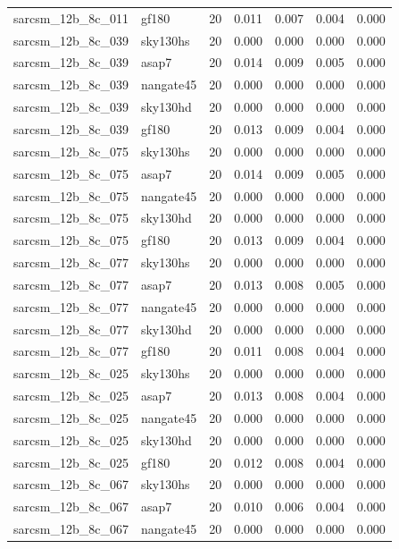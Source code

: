 \begin{tabular}{llrrrrr}
sarcsm\_12b\_8c\_011 & gf180 & 20 & 0.011 & 0.007 & 0.004 & 0.000 \\
sarcsm\_12b\_8c\_039 & sky130hs & 20 & 0.000 & 0.000 & 0.000 & 0.000 \\
sarcsm\_12b\_8c\_039 & asap7 & 20 & 0.014 & 0.009 & 0.005 & 0.000 \\
sarcsm\_12b\_8c\_039 & nangate45 & 20 & 0.000 & 0.000 & 0.000 & 0.000 \\
sarcsm\_12b\_8c\_039 & sky130hd & 20 & 0.000 & 0.000 & 0.000 & 0.000 \\
sarcsm\_12b\_8c\_039 & gf180 & 20 & 0.013 & 0.009 & 0.004 & 0.000 \\
sarcsm\_12b\_8c\_075 & sky130hs & 20 & 0.000 & 0.000 & 0.000 & 0.000 \\
sarcsm\_12b\_8c\_075 & asap7 & 20 & 0.014 & 0.009 & 0.005 & 0.000 \\
sarcsm\_12b\_8c\_075 & nangate45 & 20 & 0.000 & 0.000 & 0.000 & 0.000 \\
sarcsm\_12b\_8c\_075 & sky130hd & 20 & 0.000 & 0.000 & 0.000 & 0.000 \\
sarcsm\_12b\_8c\_075 & gf180 & 20 & 0.013 & 0.009 & 0.004 & 0.000 \\
sarcsm\_12b\_8c\_077 & sky130hs & 20 & 0.000 & 0.000 & 0.000 & 0.000 \\
sarcsm\_12b\_8c\_077 & asap7 & 20 & 0.013 & 0.008 & 0.005 & 0.000 \\
sarcsm\_12b\_8c\_077 & nangate45 & 20 & 0.000 & 0.000 & 0.000 & 0.000 \\
sarcsm\_12b\_8c\_077 & sky130hd & 20 & 0.000 & 0.000 & 0.000 & 0.000 \\
sarcsm\_12b\_8c\_077 & gf180 & 20 & 0.011 & 0.008 & 0.004 & 0.000 \\
sarcsm\_12b\_8c\_025 & sky130hs & 20 & 0.000 & 0.000 & 0.000 & 0.000 \\
sarcsm\_12b\_8c\_025 & asap7 & 20 & 0.013 & 0.008 & 0.004 & 0.000 \\
sarcsm\_12b\_8c\_025 & nangate45 & 20 & 0.000 & 0.000 & 0.000 & 0.000 \\
sarcsm\_12b\_8c\_025 & sky130hd & 20 & 0.000 & 0.000 & 0.000 & 0.000 \\
sarcsm\_12b\_8c\_025 & gf180 & 20 & 0.012 & 0.008 & 0.004 & 0.000 \\
sarcsm\_12b\_8c\_067 & sky130hs & 20 & 0.000 & 0.000 & 0.000 & 0.000 \\
sarcsm\_12b\_8c\_067 & asap7 & 20 & 0.010 & 0.006 & 0.004 & 0.000 \\
sarcsm\_12b\_8c\_067 & nangate45 & 20 & 0.000 & 0.000 & 0.000 & 0.000 \\

\end{tabular}
